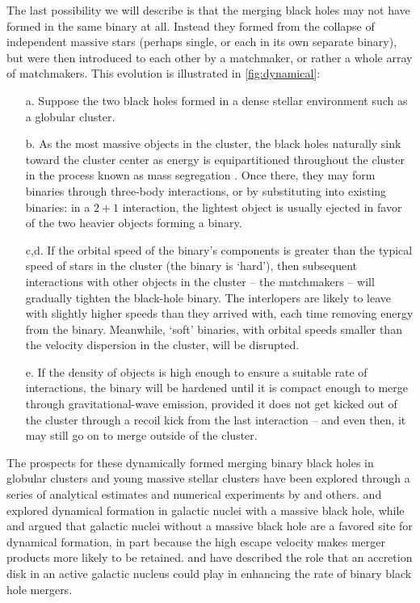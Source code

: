 \documentclass[iop,onecolumn]{revtex4-1}
\begin{document}
The last possibility we will describe is that the merging black holes may not have formed in the same binary at all.  Instead they formed from the collapse of independent massive stars (perhaps single, or each in its own separate binary), but were then introduced to each other by a matchmaker, or rather a whole array of matchmakers.   This evolution is illustrated in \autoref{fig:dynamical}: 
\begin{enumerate}
\item[a.] Suppose the two black holes formed in a dense stellar environment such as a globular cluster.  
\item[b.] As the most massive objects in the cluster, the black holes naturally sink toward the cluster center as energy is equipartitioned throughout the cluster in the process known as mass segregation \citep[but see][]{Trenti:2013}.  Once there, they may form binaries through three-body interactions, or by substituting into existing binaries: in a $2+1$ interaction, the lightest object is usually ejected in favor of the two heavier objects forming a binary.  
\item[c,d.] If the orbital speed of the binary's components is greater than the typical speed of stars in the cluster (the binary is `hard'), then subsequent interactions with other objects in the cluster -- the matchmakers -- will gradually tighten the black-hole binary. The interlopers are likely to leave with slightly higher speeds than they arrived with, each time removing energy from the binary.   Meanwhile, `soft' binaries, with orbital speeds smaller than the velocity dispersion in the cluster, will be disrupted.
\item[e.] If the density of objects is high enough to ensure a suitable rate of interactions, the binary will be hardened until it is compact enough to merge through gravitational-wave emission, provided it does not get kicked out of the cluster through a recoil kick from the last interaction -- and even then, it may still go on to merge outside of the cluster.  
\end{enumerate}

The prospects for these dynamically formed merging binary black holes in globular clusters and young massive stellar clusters have been explored through a series of analytical estimates and numerical experiments by \citet{Sigurdsson:1993,Kulkarni:1993,PZwart:2000,OLeary:2006,Banerjee:2010,Downing:2011,Morscher:2015,Mapelli:2016,Rodriguez:2016} and others.  \citet{OLeary:2008} \citep[but see][]{Tsang:2013} and \citet{AntoniniPerets:2012} explored dynamical formation in galactic nuclei with a massive black hole, while \citet{MillerLauburg:2008} and \citet{AntoniniRasio:2016} argued that galactic nuclei without a massive black hole are a favored site for dynamical formation, in part because the high escape velocity makes merger products more likely to be retained.  \citet{Bartos:2016} and \citet{Stone:2016} have described the role that an accretion disk in an active galactic nucleus could play in enhancing the rate of binary black hole mergers.
\end{document}
